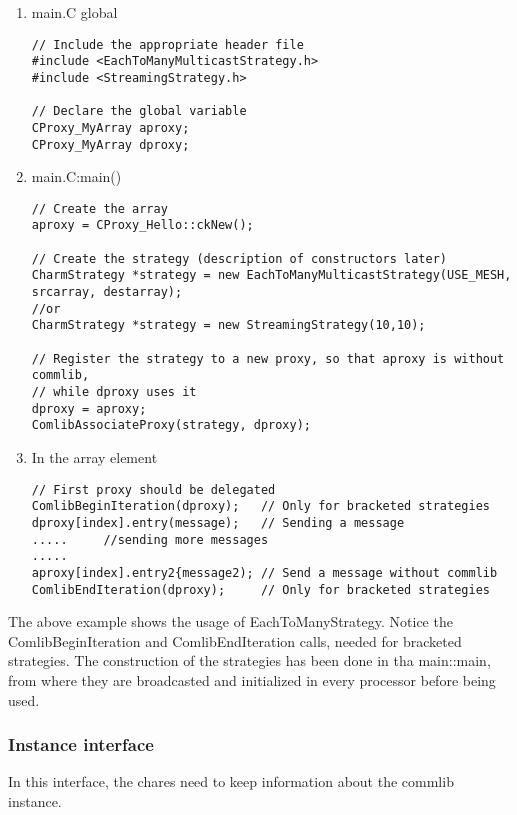 \begin{enumerate}
\item main.C global
\begin{verbatim}
// Include the appropriate header file
#include <EachToManyMulticastStrategy.h>
#include <StreamingStrategy.h>

// Declare the global variable
CProxy_MyArray aproxy;
CProxy_MyArray dproxy;
\end{verbatim}

\item main.C:main()
\begin{verbatim}
// Create the array
aproxy = CProxy_Hello::ckNew();

// Create the strategy (description of constructors later)
CharmStrategy *strategy = new EachToManyMulticastStrategy(USE_MESH, srcarray, destarray);
//or
CharmStrategy *strategy = new StreamingStrategy(10,10);

// Register the strategy to a new proxy, so that aproxy is without commlib,
// while dproxy uses it
dproxy = aproxy;
ComlibAssociateProxy(strategy, dproxy);
\end{verbatim}

\item In the array element
\begin{verbatim}
// First proxy should be delegated
ComlibBeginIteration(dproxy);   // Only for bracketed strategies
dproxy[index].entry(message);   // Sending a message
.....     //sending more messages
.....
aproxy[index].entry2{message2); // Send a message without commlib
ComlibEndIteration(dproxy);     // Only for bracketed strategies
\end{verbatim}
\end{enumerate}

The above example shows the usage of EachToManyStrategy. Notice the
ComlibBeginIteration and ComlibEndIteration calls, needed for bracketed
strategies. The construction of the strategies has been done in tha main::main,
from where they are broadcasted and initialized in every processor before being
used.

\subsubsection{Instance interface}

In this interface, the chares need to keep information about the commlib instance.

